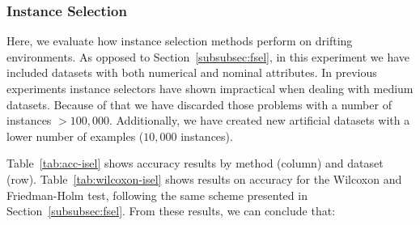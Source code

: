 \documentclass[preprint,12pt]{elsarticle}
\begin{document}



\subsubsection{\textbf{Instance Selection}}
\label{subsubsec:isel}

Here, we evaluate how instance selection methods perform on drifting environments. As opposed to Section~\ref{subsubsec:fsel}, in this experiment we have included datasets with both numerical and nominal attributes. In previous experiments instance selectors have shown impractical when dealing with medium datasets. Because of that we have discarded those problems with a number of instances $> 100,000$. Additionally, we have created new artificial datasets with a lower number of examples ($10,000$ instances). 

Table~\ref{tab:acc-isel} shows accuracy results by method (column) and dataset (row). Table~\ref{tab:wilcoxon-isel} shows results on accuracy for the Wilcoxon and Friedman-Holm test, following the same scheme presented in Section~\ref{subsubsec:fsel}. From these results, we can conclude that: 
\end{document}
